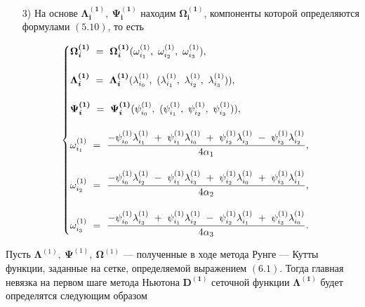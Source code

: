 \documentclass[14pt]{extreport}
\begin{document}
\begin{itemize}
\item[3)] На основе $\boldsymbol{\Lambda_{i}^{(1)}},\ \boldsymbol{\Psi_{i}^{(1)}}$ находим
$\boldsymbol{\Omega_{i}^{(1)}}$, компоненты которой определяются формулами $(5.10)$, то есть

\begin{equation}
\begin{cases}
\boldsymbol{\Omega_{i}^{(1)}}\ =\ \boldsymbol{\Omega_{i}^{(1)}}(\omega_{i_1}^{(1)},\ \omega_{i_2}^{(1)},\ \omega_{i_3}^{(1)}), \\ \\
\boldsymbol{\Lambda_{i}^{(1)}}\ =\ \boldsymbol{\Lambda_{i}^{(1)}}(\lambda_{i_0}^{(1)},\ (\lambda_{i_1}^{(1)},\ \lambda_{i_2}^{(1)},\ \lambda_{i_3}^{(1)})), \\ \\
\boldsymbol{\Psi_{i}^{(1)}}\ =\ \boldsymbol{\Psi_{i}^{(1)}}(\psi_{i_0}^{(1)},\ (\psi_{i_1}^{(1)},\ \psi_{i_2}^{(1)},\ \psi_{i_3}^{(1)})), \\ \\
\omega_{i_1}^{(1)}\ =\ \dfrac{- \psi_{i_0}^{(1)}\lambda_{i_1}^{(1)}\ +\ \psi_{i_1}^{(1)}\lambda_{i_0}^{(1)}\ +\ 
\psi_{i_2}^{(1)}\lambda_{i_3}^{(1)}\ -\ \psi_{i_3}^{(1)}\lambda_{i_2}^{(1)}}{4\alpha_1}, \\ \\
\omega_{i_2}^{(1)}\ =\ \dfrac{- \psi_{i_0}^{(1)}\lambda_{i_2}^{(1)}\ -\ \psi_{i_1}^{(1)}\lambda_{i_3}^{(1)}\ +\ 
\psi_{i_2}^{(1)}\lambda_{i_0}^{(1)}\ +\ \psi_{i_3}^{(1)}\lambda_{i_1}^{(1)}}{4\alpha_2}, \\ \\
\omega_{i_3}^{(1)}\ =\ \dfrac{- \psi_{i_0}^{(1)}\lambda_{i_3}^{(1)}\ +\ \psi_{i_1}^{(1)}\lambda_{i_2}^{(1)}\ -\ 
\psi_{i_2}^{(1)}\lambda_{i_1}^{(1)}\ +\ \psi_{i_3}^{(1)}\lambda_{i_0}^{(1)}}{4\alpha_3}.
\newline

 \end{cases}
\end{equation}
\end{itemize}

Пусть $\boldsymbol\Lambda^{(1)},\ \boldsymbol\Psi^{(1)},\ \boldsymbol\Omega^{(1)}$ --- полученные в ходе метода Рунге --- Кутты функции, заданные на сетке,
определяемой выражением $(6.1)$. Тогда главная невязка на первом шаге метода Ньютона $\boldsymbol{D^{(1)}}$
сеточной функции $\boldsymbol{\Lambda^{(1)}}$ будет определятся следующим образом
\end{document}
